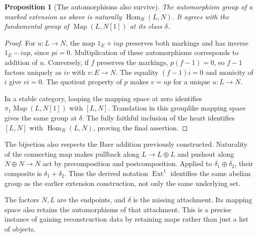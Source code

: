 \documentclass[11pt]{article}
\newtheorem{proposition}[theorem]{Proposition}
\theoremstyle{definition}
\theoremstyle{remark}\newtheorem{remark}[theorem]{Remark}
\begin{document}
\begin{proposition}[The automorphisms also survive]
\label{t:extension-automorphisms}
The automorphism group of a marked extension as above is naturally
$\operatorname{Hom}_R(L,N)$.  It agrees with the fundamental group of
$\operatorname{Map}(L,N[1])$ at its class $\delta$.
\end{proposition}
\begin{proof}
For $u:L\to N$, the map $1_E+iup$ preserves both markings and has
inverse $1_E-iup$, since $pi=0$.  Multiplication of these automorphisms
corresponds to addition of $u$.
Conversely, if $f$ preserves the markings, $p(f-1)=0$, so $f-1$ factors
uniquely as $iv$ with $v:E\to N$.  The equality $(f-1)i=0$ and
monicity of $i$ give $vi=0$.  The quotient property of $p$ makes $v=up$
for a unique $u:L\to N$.

In a stable category, looping the mapping space at zero identifies
$\pi_1\operatorname{Map}(L,N[1])$ with $[L,N]$.  Translation in this
grouplike mapping space gives the same group at $\delta$.
The fully faithful inclusion of the heart identifies $[L,N]$ with
$\operatorname{Hom}_R(L,N)$, proving the final assertion.
\end{proof}

The bijection also respects the Baer addition previously
constructed. Naturality of the connecting map makes pullback along
$L\to L\oplus L$ and pushout along $N\oplus N\to N$ act by
precomposition and postcomposition. Applied to $\delta_1\oplus\delta_2$,
their composite is $\delta_1+\delta_2$. Thus the derived notation
$\operatorname{Ext}^1$ identifies the same abelian group as the earlier
extension construction, not only the same underlying set.

The factors $N,L$ are the endpoints, and $\delta$ is the missing
attachment.  Its mapping space also retains the automorphisms of that
attachment.  This is a precise instance of gaining reconstruction data
by retaining maps rather than just a list of objects.
\end{document}
